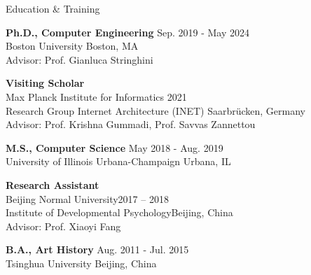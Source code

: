 \documentclass[12pt]{resume}
\begin{document}



\begin{rSection}{Education \& Training}
\item \textbf{Ph.D., Computer Engineering} \hfill Sep. 2019 - May 2024
\\Boston University \hfill Boston, MA\\
{Advisor: Prof. Gianluca Stringhini}

\item \textbf{Visiting Scholar}\\ 
Max Planck Institute for Informatics \hfill 2021\\
Research Group Internet Architecture (INET) \hfill Saarbr{\"u}cken, Germany
\\Advisor: Prof. Krishna Gummadi, Prof. Savvas Zannettou


\item \textbf{M.S., Computer Science} \hfill May 2018 - Aug. 2019
\\University of Illinois Urbana-Champaign \hfill Urbana, IL

\item \textbf{Research Assistant}\\
Beijing Normal University\hfill 2017 – 2018\\
Institute of Developmental Psychology\hfill Beijing, China
\\Advisor: Prof. Xiaoyi Fang 

\item \textbf{B.A., Art History} \hfill Aug. 2011 - Jul. 2015
\\Tsinghua University \hfill Beijing, China
\end{rSection}

\medskip
\end{document}
